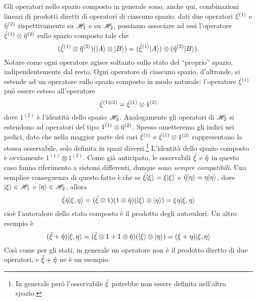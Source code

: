 Gli operatori nello spazio composto in generale sono, anche qui, combinazioni lineari di prodotti diretti di operatori di ciascuno spazio: dati due operatori $\hat{\xi}^{(1)}$ e $\hat{\eta}^{(2)}$ rispettivamente su $\mathscr H_1$ e su $\mathscr H_2$, possiamo associare ad essi l'operatore $\hat{\xi}^{(1)}\otimes\hat{\eta}^{(2)}$ sullo spazio composto tale che
\begin{equation}
	(\hat{\xi}^{(1)}\otimes\hat{\eta}^{(2)})(\lvert A\rangle\otimes\lvert B\rangle)=(\hat{\xi}^{(1)}\lvert A\rangle)\otimes(\hat{\eta}^{(2)}\lvert B\rangle).
\end{equation}
Notare come ogni operatore agisce soltanto sullo stato del ``proprio'' spazio, indipendentemente dal resto.
Ogni operatore di ciascuno spazio, d'altronde, si estende ad un operatore sullo spazio composto in modo naturale: l'operatore $\hat{\xi}^{(1)}$ può essere esteso all'operatore
\begin{equation}
	\hat{\xi}^{(1\otimes 2)}=\hat{\xi}^{(1)}\otimes 1^{(2)}
    \label{eq:estensione-operatore-singola-particella}
\end{equation}
dove $1^{(2)}$ è l'identità dello spazio $\mathscr H_2$.
Analogamente gli operatori di $\mathscr H_2$ si estendono ad operatori del tipo $1^{(1)}\otimes\hat{\eta}^{(2)}$.
Spesso ometteremo gli indici nei pedici, dato che nella maggior parte dei casi $\hat{\xi}^{(1)}$ e $\hat{\xi}^{(1)}\otimes 1^{(2)}$ rappresentano la stessa osservabile, solo definita in spazi diversi.\footnote{
	In generale però l'osservabile $\hat{\xi}$ potrebbe non essere definita nell'altro spazio.
}
L'identità dello spazio composto è ovviamente $1^{(1)}\otimes 1^{(2)}$.
Come già anticipato, le osservabili $\hat{\xi}$ e $\hat{\eta}$ in questo caso fanno riferimento a sistemi differenti, dunque sono \emph{sempre compatibili}.
Una semplice conseguenza di questo fatto è che se $\hat{\xi}\lvert\xi\rangle=\xi\lvert\xi\rangle$ e $\hat{\eta}\lvert\eta\rangle=\eta\lvert\eta\rangle$, dove $\lvert\xi\rangle\in\mathscr H_1$ e $\lvert\eta\rangle\in\mathscr H_2$, allora
\begin{equation}
	\hat{\xi}\hat{\eta}\lvert\xi,\eta\rangle=(\hat{\xi}\otimes 1)(1\otimes\hat{\eta})(\lvert\xi\rangle\otimes\lvert\eta\rangle)=\xi\eta\lvert\xi,\eta\rangle
\end{equation}
cioè l'autovalore dello stato composto è il prodotto degli autovalori.
Un altro esempio è
\begin{equation}
	(\hat{\xi}+\hat{\eta})\lvert\xi,\eta\rangle=(\hat{\xi}\otimes 1+1\otimes\hat{\eta})(\lvert\xi\rangle\otimes\lvert\eta\rangle)=(\xi+\eta)\lvert\xi,\eta\rangle
\end{equation}
Cos\`i come per gli stati, in generale un operatore non è il prodotto diretto di due operatori, e $\hat{\xi}+\hat{\eta}$ ne è un esempio.
